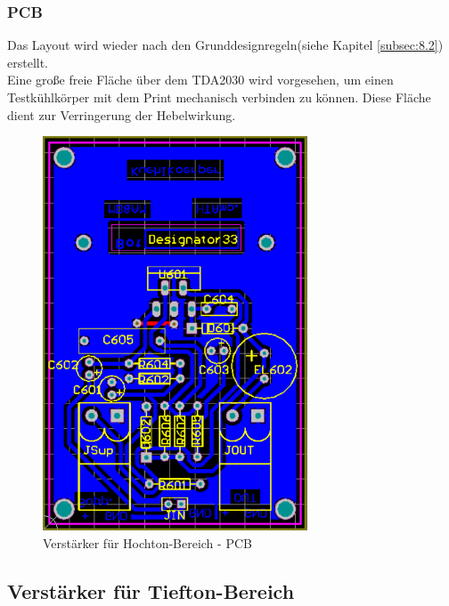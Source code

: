\newpage
\subsubsection{PCB}\label{subsec:5.1.3}
Das Layout wird wieder nach den Grunddesignregeln(siehe Kapitel \ref{subsec:8.2}) erstellt.\\
Eine große freie Fläche über dem TDA2030 wird vorgesehen, um einen Testkühlkörper mit dem Print mechanisch verbinden zu können.
Diese Fläche dient zur Verringerung der Hebelwirkung.

\begin{figure} [H]
	\centering	
	\includegraphics[width=0.7\textwidth]{img/Print6/HTVerstaerker-PCB.PNG}
	\caption{Verstärker für Hochton-Bereich - PCB}
	\label {fig:5.1.3.1}
\end{figure}


\newpage
\subsection{Verstärker für Tiefton-Bereich}
